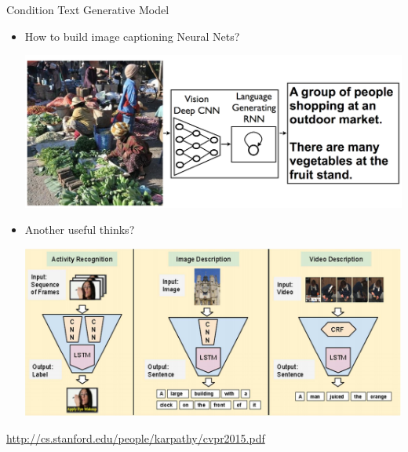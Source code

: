 \documentclass{beamer}
\begin{document}
\begin{frame}{Condition Text Generative Model}
	\begin{itemize}
		\item   How to build image captioning Neural Nets?
			 \begin{center}
				\includegraphics[scale=0.1]{img/googlernncnn.png}
			\end{center}
		\item  Another useful thinks?
					 \begin{center}
						\includegraphics[scale=0.17]{img/im2txt}
					\end{center}
	\end{itemize}
	
		 	 \begin{tcolorbox}[enhanced,size=fbox,fontupper=\large\bfseries, colback=black!80, colframe=black!80]
		 		\begin{center}
		 			\text{\textcolor{white}{But, extremely complex to train}}
		 		\end{center}
		 	\end{tcolorbox}

	
	 \href{http://cs.stanford.edu/people/karpathy/cvpr2015.pdf}{http://cs.stanford.edu/people/karpathy/cvpr2015.pdf}
\end{frame}
\end{document}
